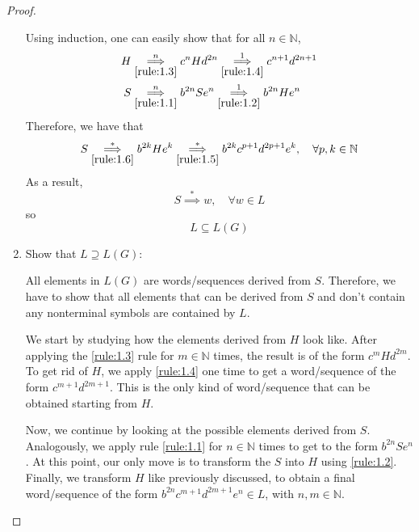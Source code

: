 \documentclass[11pt]{article}
\begin{document}
\begin{proof}
\begin{enumerate}
            Using induction, one can easily show that for all $n \in \mathbb{N}$,
            \begin{align}
                H &\overset{n}{\underset{\eqref{rule:1.3}}{\implies}} c^{n}Hd^{2n} 
                \overset{1}{\underset{\eqref{rule:1.4}}{\implies}} c^{n + 1}d^{2n + 1} 
                \label{rule:1.5} \\
                S &\overset{n}{\underset{\eqref{rule:1.1}}{\implies}} b^{2n}Se^n 
                \overset{1}{\underset{\eqref{rule:1.2}}{\implies}} b^{2n}He^n
                \label{rule:1.6}
            \end{align}
            Therefore, we have that
            \[
                S \overset{*}{\underset{\eqref{rule:1.6}}{\implies}}
                b^{2k}He^k
                \overset{*}{\underset{\eqref{rule:1.5}}{\implies}}
                b^{2k}c^{p + 1}d^{2p + 1} e^k, \hspace{1em} \forall p, k \in \mathbb{N}
            \] 
            As a result, 
            \[
                S \overset{*}{\implies} w, \hspace{1em} \forall w \in L
            \] 
            so 
            \begin{equation}\label{incl:1.1}
                L \subseteq L(G)
            \end{equation}

            \item Show that $L \supseteq L(G)$:

            All elements in $L(G)$ are words/sequences derived from  $S$. Therefore,
            we have to show that all elements that can be derived from $S$ and don't contain
            any nonterminal symbols are contained by $L$. 

            We start by studying how the elements derived from $H$ look like. After applying 
            the \eqref{rule:1.3} rule for $m \in \mathbb{N}$ times, the result is of the form
            $c^mHd^{2m}$. To get rid of $H$, we apply \eqref{rule:1.4} one time to get
            a word/sequence of the form $c^{m + 1}d^{2m + 1}$. This is the only kind of 
            word/sequence that can be obtained starting from $H$.

            Now, we continue by looking at the possible elements derived from $S$. Analogously,
            we apply rule \eqref{rule:1.1} for $n \in \mathbb{N}$ times to get to the form
            $b^{2n}Se^n$. At this point, our only move is to transform the $S$ into $H$ using
            \eqref{rule:1.2}. Finally, we transform $H$ like previously discussed, to obtain a final
            word/sequence of the form $b^{2n}c^{m + 1}d^{2m + 1}e^n \in L$, with $n, m \in \mathbb{N}$.


\end{enumerate}
\end{proof}
\end{document}
